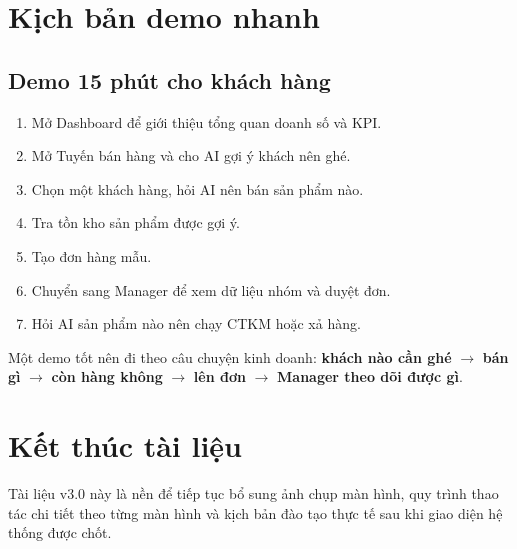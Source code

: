 \documentclass[12pt,a4paper,oneside,openany]{book}
\begin{document}
\chapter{Kịch bản demo nhanh}

\section*{Demo 15 phút cho khách hàng}
\begin{enumerate}
  \item Mở Dashboard để giới thiệu tổng quan doanh số và KPI.
  \item Mở Tuyến bán hàng và cho AI gợi ý khách nên ghé.
  \item Chọn một khách hàng, hỏi AI nên bán sản phẩm nào.
  \item Tra tồn kho sản phẩm được gợi ý.
  \item Tạo đơn hàng mẫu.
  \item Chuyển sang Manager để xem dữ liệu nhóm và duyệt đơn.
  \item Hỏi AI sản phẩm nào nên chạy CTKM hoặc xả hàng.
\end{enumerate}

\begin{tcolorbox}[tipBox]
Một demo tốt nên đi theo câu chuyện kinh doanh: \textbf{khách nào cần ghé} $\rightarrow$ \textbf{bán gì} $\rightarrow$ \textbf{còn hàng không} $\rightarrow$ \textbf{lên đơn} $\rightarrow$ \textbf{Manager theo dõi được gì}.
\end{tcolorbox}

\chapter*{Kết thúc tài liệu}

Tài liệu v3.0 này là nền để tiếp tục bổ sung ảnh chụp màn hình, quy trình thao tác chi tiết theo từng màn hình và kịch bản đào tạo thực tế sau khi giao diện hệ thống được chốt.

\printindex
\end{document}
